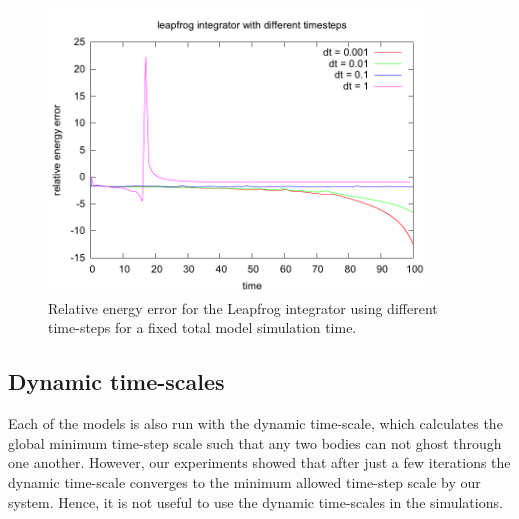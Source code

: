 \documentclass[11pt]{article} %
\begin{document}
\begin{figure}
    \includegraphics[width=0.9\textwidth]{leapfrog_different_timesteps.png}
    \caption{Relative energy error for the Leapfrog integrator using different time-steps for a fixed total model simulation time.}
    \label{fig:leapfrog}
\end{figure}

\subsection{Dynamic time-scales}
Each of the models is also run with the dynamic time-scale, which calculates the global minimum time-step scale such that any two bodies can not ghost through one another. However, our experiments showed that after just a few iterations the dynamic time-scale converges to the minimum allowed time-step scale by our system. Hence, it is not useful to use the dynamic time-scales in the simulations.
\end{document}
